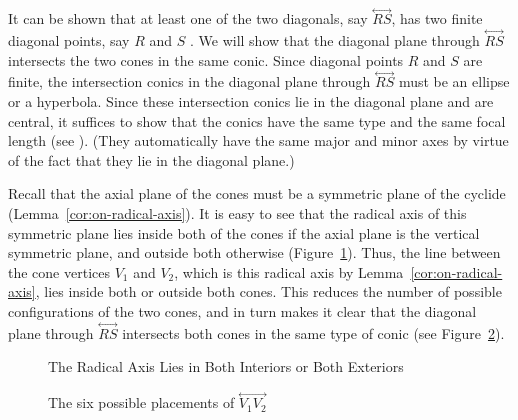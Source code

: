 It can be shown that at least one of the two diagonals, say 
$\stackrel{\longleftrightarrow}{RS}$,
has two finite diagonal points, say $R$ and $S$ 
\cite[Lemmas~5.7 and 5.8]{shenethesis}.
We will show that the diagonal plane through 
$\stackrel{\longleftrightarrow}{RS}$ intersects the two cones in the same 
conic.
Since diagonal points $R$ and $S$ are finite, the intersection 
conics in the diagonal plane through $\stackrel{\longleftrightarrow}{RS}$ 
must be an ellipse or a hyperbola.
Since these intersection conics lie in the diagonal plane and are central,
it suffices to show that the conics have the same type and the same 
focal length (see \cite[Theorem 4.2]{shenethesis}).
(They automatically have the same major and minor axes by virtue
of the fact that they lie in the diagonal plane.)

Recall that the axial plane of the cones must be a symmetric plane of the
cyclide (Lemma~\ref{cor:on-radical-axis}).
It is easy to see that the radical axis of this symmetric plane
lies inside both of the cones
if the axial plane is the vertical symmetric plane, and outside both
otherwise (Figure~\ref{fig:int-ext}).
Thus, the line between the cone vertices $V_1$ and $V_2$, 
which is this radical axis by
Lemma~\ref{cor:on-radical-axis}, lies inside both or outside both cones.
This reduces the number of possible configurations of the two cones,
and in turn makes it clear that the diagonal plane through 
$\stackrel{\longleftrightarrow}{RS}$ intersects both cones in the same type
of conic (see Figure~\ref{fig:configs}).

\begin{figure}
\vspace{8cm}
\caption{The Radical Axis Lies in Both Interiors or Both Exteriors}
\label{fig:int-ext}
\end{figure}

\begin{figure}
\vspace{7cm}
\caption{The six possible placements of $\stackrel{\longleftrightarrow}{V_1V_2}$}
\label{fig:configs}
\end{figure}

